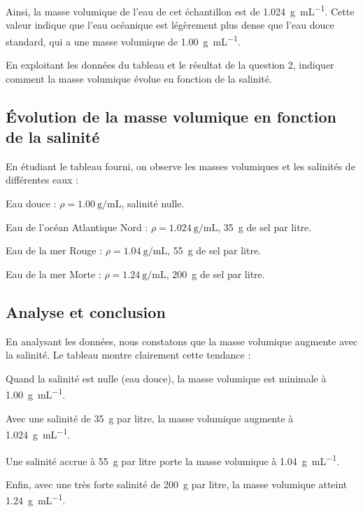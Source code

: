 \documentclass[answers]{exam}
\begin{document}
\begin{questions}
\begin{solution}
Ainsi, la masse volumique de l'eau de cet échantillon est de \SI{1.024}{\gram\per\milli\liter}. Cette valeur indique que l'eau océanique est légèrement plus dense que l'eau douce standard, qui a une masse volumique de \SI{1.00}{\gram\per\milli\liter}.

\end{solution}

\question[2] En exploitant les données du tableau et le résultat de la question 2, indiquer comment la masse volumique évolue en fonction de la salinité.
  
  

\begin{solution}

\subsection*{Évolution de la masse volumique en fonction de la salinité}

En étudiant le tableau fourni, on observe les masses volumiques et les salinités de différentes eaux :

\begin{compactitem}
    \item Eau douce : $\rho = \SI{1.00}{\gram\per\milli\liter}$, salinité nulle.
    \item Eau de l'océan Atlantique Nord : $\rho = \SI{1.024}{\gram\per\milli\liter}$, \SI{35}{\gram} de sel par litre.
    \item Eau de la mer Rouge : $\rho = \SI{1.04}{\gram\per\milli\liter}$, \SI{55}{\gram} de sel par litre.
    \item Eau de la mer Morte : $\rho = \SI{1.24}{\gram\per\milli\liter}$, \SI{200}{\gram} de sel par litre.
\end{compactitem}

\subsection*{Analyse et conclusion}

En analysant les données, nous constatons que la masse volumique augmente avec la salinité. Le tableau montre clairement cette tendance :

\begin{compactitem}
    \item Quand la salinité est nulle (eau douce), la masse volumique est minimale à \SI{1.00}{\gram\per\milli\liter}.
    \item Avec une salinité de \SI{35}{\gram} par litre, la masse volumique augmente à \SI{1.024}{\gram\per\milli\liter}.
    \item Une salinité accrue à \SI{55}{\gram} par litre porte la masse volumique à \SI{1.04}{\gram\per\milli\liter}.
    \item Enfin, avec une très forte salinité de \SI{200}{\gram} par litre, la masse volumique atteint \SI{1.24}{\gram\per\milli\liter}.
\end{compactitem}


\end{solution}
\end{questions}
\end{document}
